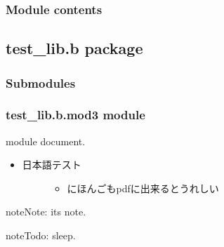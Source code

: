 \documentclass[letterpaper,10pt,dvipdfmx]{sphinxmanual}
\begin{document}
\subsubsection{Module contents}
\label{\detokenize{test_lib.a:module-test_lib.a}}\label{\detokenize{test_lib.a:module-contents}}

\subsection{test\_lib.b package}
\label{\detokenize{test_lib.b:test-lib-b-package}}\label{\detokenize{test_lib.b::doc}}

\subsubsection{Submodules}
\label{\detokenize{test_lib.b:submodules}}

\subsubsection{test\_lib.b.mod3 module}
\label{\detokenize{test_lib.b:module-test_lib.b.mod3}}\label{\detokenize{test_lib.b:test-lib-b-mod3-module}}
module document.
\begin{itemize}
\item {} \begin{description}
\item[{日本語テスト}] \leavevmode\begin{itemize}
\item {} 
にほんごもpdfに出来るとうれしい

\end{itemize}

\end{description}

\end{itemize}

\begin{sphinxadmonition}{note}{Note:}
it\textquotesingle{}s note.
\end{sphinxadmonition}

\begin{sphinxadmonition}{note}{\label{\detokenize{test_lib.b:id1}}Todo:}
sleep.
\end{sphinxadmonition}
\end{document}
